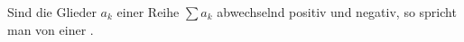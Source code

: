 Sind die Glieder $a_k$ einer Reihe $\sum a_k$ abwechselnd positiv und negativ, so spricht man von einer .